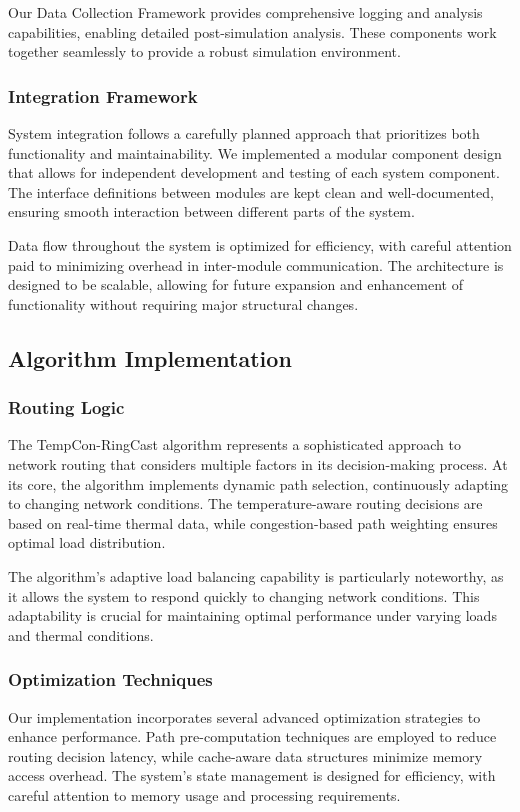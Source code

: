 \documentclass[12pt]{article}
\begin{document}
Our Data Collection Framework provides comprehensive logging and analysis capabilities, enabling detailed post-simulation analysis. These components work together seamlessly to provide a robust simulation environment.

\subsubsection{Integration Framework}
System integration follows a carefully planned approach that prioritizes both functionality and maintainability. We implemented a modular component design that allows for independent development and testing of each system component. The interface definitions between modules are kept clean and well-documented, ensuring smooth interaction between different parts of the system.

Data flow throughout the system is optimized for efficiency, with careful attention paid to minimizing overhead in inter-module communication. The architecture is designed to be scalable, allowing for future expansion and enhancement of functionality without requiring major structural changes.

\subsection{Algorithm Implementation}
\subsubsection{Routing Logic}
The TempCon-RingCast algorithm represents a sophisticated approach to network routing that considers multiple factors in its decision-making process. At its core, the algorithm implements dynamic path selection, continuously adapting to changing network conditions. The temperature-aware routing decisions are based on real-time thermal data, while congestion-based path weighting ensures optimal load distribution.

The algorithm's adaptive load balancing capability is particularly noteworthy, as it allows the system to respond quickly to changing network conditions. This adaptability is crucial for maintaining optimal performance under varying loads and thermal conditions.

\subsubsection{Optimization Techniques}
Our implementation incorporates several advanced optimization strategies to enhance performance. Path pre-computation techniques are employed to reduce routing decision latency, while cache-aware data structures minimize memory access overhead. The system's state management is designed for efficiency, with careful attention to memory usage and processing requirements.
\end{document}
